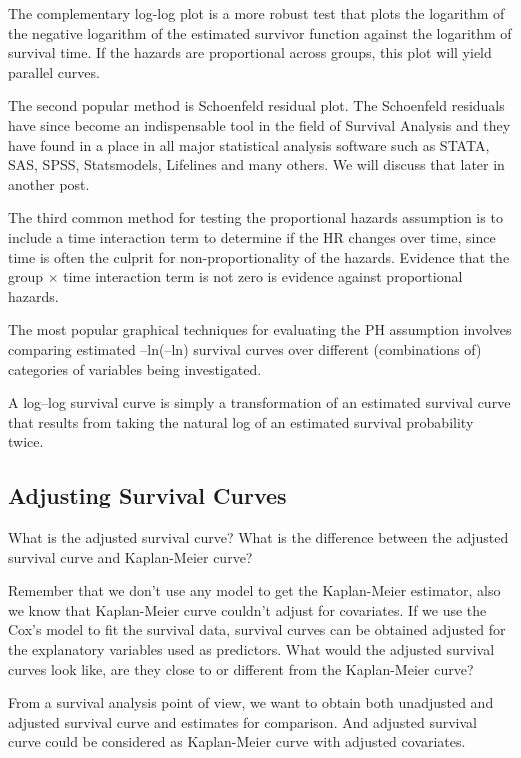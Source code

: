 \documentclass[11pt]{article} %
\begin{document}
The complementary log-log plot is a more robust test that plots the logarithm of the negative logarithm of the estimated survivor function against the logarithm of survival time. If the hazards are proportional across groups, this plot will yield parallel curves. 

The second popular method is Schoenfeld residual plot. The Schoenfeld residuals have since become an indispensable tool in the field of Survival Analysis and they have found in a place in all major statistical analysis software such as STATA, SAS, SPSS, Statsmodels, Lifelines and many others. We will discuss that later in another post.

The third common method for testing the proportional hazards assumption is to include a time interaction term to determine if the HR changes over time, since time is often the culprit for non-proportionality of the hazards. Evidence that the group $\times$ time interaction term is not zero is evidence against proportional hazards.

The most popular graphical techniques for evaluating the PH assumption involves comparing estimated –ln(–ln) survival curves over different (combinations of) categories of variables being investigated.

A log–log survival curve is simply a transformation of an estimated survival curve that results from taking the natural log of an estimated survival probability twice.

\subsection{Adjusting Survival Curves}

What is the adjusted survival curve? What is the difference between the adjusted survival curve and Kaplan-Meier curve?

Remember that we don't use any model to get the Kaplan-Meier estimator, also we know that Kaplan-Meier curve couldn't adjust for covariates. If we use the Cox's model to fit the survival data, survival curves can be obtained adjusted for the explanatory variables used as predictors. What would the adjusted survival curves look like, are they close to or different from the Kaplan-Meier curve?

From a survival analysis point of view, we want to obtain both unadjusted and adjusted survival curve and estimates for comparison. And adjusted survival curve could be considered as Kaplan-Meier curve with adjusted covariates.
\end{document}
